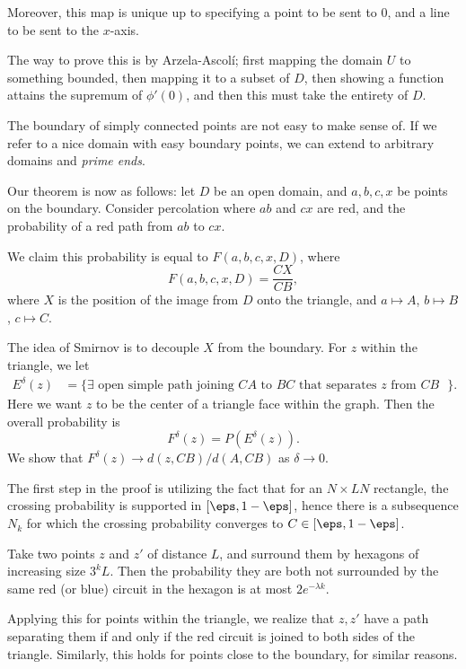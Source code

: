 \documentclass[12pt]{article}
\begin{document}
Moreover, this map is unique up to specifying a point to be sent to $0$, and a line to be sent to the $x$-axis.

The way to prove this is by Arzela-Ascol\'i; first mapping the domain $U$ to something bounded, then mapping it to a subset of $D$, then showing a function attains the supremum of $\phi'(0)$, and then this must take the entirety of $D$.

The boundary of simply connected points are not easy to make sense of. If we refer to a nice domain with easy boundary points, we can extend to arbitrary domains and \emph{prime ends}.

Our theorem is now as follows: let $D$ be an open domain, and $a, b, c, x$ be points on the boundary. Consider percolation where $ab$ and $cx$ are red, and the probability of a red path from $ab$ to $cx$.

We claim this probability is equal to $F(a, b, c, x, D)$, where
\[
F(a, b, c, x, D) = \frac{CX}{CB},
\]
where $X$ is the position of the image from $D$ onto the triangle, and $a \mapsto A$, $b \mapsto B$, $c \mapsto C$.


The idea of Smirnov is to decouple $X$ from the boundary. For $z$ within the triangle, we let
\begin{align*}
	E^{\delta}(z) &= \{\exists \text{ open simple path joining $CA$ to $BC$ that separates $z$ from $CB$ }\}.
\end{align*}
Here we want $z$ to be the center of a triangle face within the graph. Then the overall probability is
\[
F^{\delta}(z) = P(E^{\delta}(z)).
\]
We show that $F^{\delta}(z) \to d(z,CB)/d(A,CB)$ as $\delta \to 0$.

The first step in the proof is utilizing the fact that for an $N \times LN$ rectangle, the crossing probability is supported in $[\eps, 1 - \eps]$, hence there is a subsequence $N_k$ for which the crossing probability converges to $C \in [\eps, 1- \eps]$.

Take two points $z$ and $z'$ of distance $L$, and surround them by hexagons of increasing size $3^{k} L$. Then the probability they are both not surrounded by the same red (or blue) circuit in the hexagon is at most $2 e^{-\lambda k}$.

Applying this for points within the triangle, we realize that $z, z'$ have a path separating them if and only if the red circuit is joined to both sides of the triangle. Similarly, this holds for points close to the boundary, for similar reasons.
\end{document}
